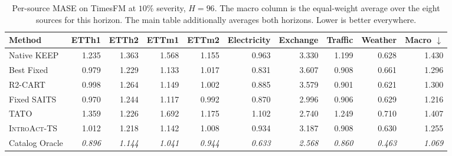 \documentclass{article}
\newcommand{\oracle}[1]{\textit{\textcolor{phgray}{#1}}}
\newcommand{\introact}{\textsc{IntroAct-TS}}
\begin{document}
\begin{table}[htbp]
  \caption{Per-source MASE on TimesFM at $10\%$ severity, $H=96$. The macro column is the
  equal-weight average over the eight sources for this horizon. The main table additionally averages both horizons. Lower is better everywhere.}
  \label{tab:app-src-tf-96}
  \centering
  \small
  \setlength{\tabcolsep}{3pt}
\begin{tabular*}{\textwidth}{@{\extracolsep{\fill}}lrrrrrrrrr@{}}
    \toprule
    Method & ETTh1 & ETTh2 & ETTm1 & ETTm2 & Electricity & Exchange & Traffic & Weather & Macro $\downarrow$ \\
    \midrule
    Native KEEP & 1.235 & 1.363 & 1.568 & 1.155 & 0.963 & 3.330 & 1.199 & 0.628 & 1.430 \\
    Best Fixed & 0.979 & 1.229 & 1.133 & 1.017 & 0.831 & 3.607 & 0.908 & 0.661 & 1.296 \\
    R2-CART & 0.998 & 1.264 & 1.149 & 1.002 & 0.885 & 3.579 & 0.901 & 0.621 & 1.300 \\
    Fixed SAITS & 0.970 & 1.244 & 1.117 & 0.992 & 0.870 & 2.996 & 0.906 & 0.629 & 1.216 \\
    TATO & 1.359 & 1.226 & 1.692 & 1.175 & 1.102 & 2.740 & 1.249 & 0.710 & 1.407 \\
    \midrule
    \rowcolor{bestgray}\introact{} & 1.012 & 1.218 & 1.142 & 1.008 & 0.934 & 3.187 & 0.908 & 0.630 & 1.255 \\
    \midrule
    Catalog Oracle & \oracle{0.896} & \oracle{1.144} & \oracle{1.041} & \oracle{0.944} & \oracle{0.633} & \oracle{2.568} & \oracle{0.860} & \oracle{0.463} & \oracle{1.069} \\
    \bottomrule
  \end{tabular*}
\end{table}
\end{document}
